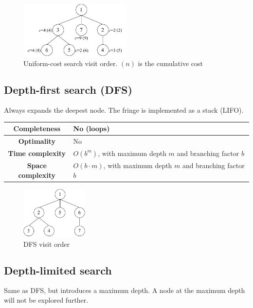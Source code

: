 \begin{figure}[h]
    \centering
    \includegraphics[width=0.50\textwidth]{img/_ucs.pdf}
    \caption{Uniform-cost search visit order. $(n)$ is the cumulative cost}
\end{figure}


\subsection{Depth-first search (DFS)}
Always expands the deepest node. The fringe is implemented as a stack (LIFO).

\begin{center}
    \def\arraystretch{1.2}
    \begin{tabular}{c | m{10cm}}
        \hline
        \textbf{Completeness} & No (loops) \\
        \hline
        \textbf{Optimality} & No \\
        \hline
        \textbf{Time complexity}
            & $O(b^m)$, with maximum depth $m$ and branching factor $b$ \\
        \hline
        \textbf{Space complexity}
            & $O(b \cdot m)$, with maximum depth $m$ and branching factor $b$ \\
        \hline
    \end{tabular}
\end{center}

\begin{figure}[h]
    \centering
    \includegraphics[width=0.30\textwidth]{img/_dfs.pdf}
    \caption{DFS visit order}
\end{figure}


\subsection{Depth-limited search}
Same as DFS, but introduces a maximum depth.
A node at the maximum depth will not be explored further.

